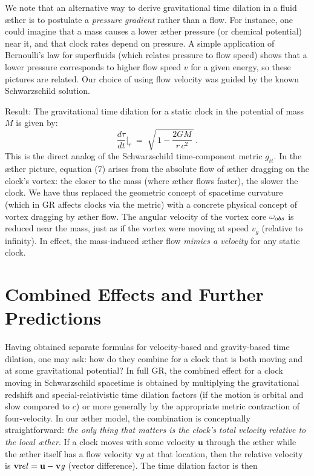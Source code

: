 \documentclass[aps,preprint,superscriptaddress]{revtex4}
\begin{document}
We note that an alternative way to derive gravitational time dilation in a fluid æther is to postulate a \textit{pressure gradient} rather than a flow. For instance, one could imagine that a mass causes a lower æther pressure (or chemical potential) near it, and that clock rates depend on pressure. A simple application of Bernoulli’s law for superfluids (which relates pressure to flow speed) shows that a lower pressure corresponds to higher flow speed $v$ for a given energy, so these pictures are related. Our choice of using flow velocity was guided by the known Schwarzschild solution.


Result: The gravitational time dilation for a static clock in the potential of mass $M$ is given by:
\begin{equation}
\boxed{\frac{d\tau}{dt}\Big|_{r} \;=\; \sqrt{\,1-\frac{2GM}{r\,c^2}\,}\,.} \tag{7}
\end{equation}
This is the direct analog of the Schwarzschild time-component metric $g_{tt}$. In the æther picture, equation (7) arises from the absolute flow of æther dragging on the clock’s vortex: the closer to the mass (where æther flows faster), the slower the clock. We have thus replaced the geometric concept of spacetime curvature (which in GR affects clocks via the metric) with a concrete physical concept of vortex dragging by æther flow. The angular velocity of the vortex core $\omega_{\textrm obs}$ is reduced near the mass, just as if the vortex were moving at speed $v_g$ (relative to infinity). In effect, the mass-induced æther flow \textit{mimics a velocity} for any static clock.


\section*{Combined Effects and Further Predictions}

Having obtained separate formulas for velocity-based and gravity-based time dilation, one may ask: how do they combine for a clock that is both moving and at some gravitational potential? In full GR, the combined effect for a clock moving in Schwarzschild spacetime is obtained by multiplying the gravitational redshift and special-relativistic time dilation factors (if the motion is orbital and slow compared to $c$) or more generally by the appropriate metric contraction of four-velocity. In our æther model, the combination is conceptually straightforward: \textit{the only thing that matters is the clock’s total velocity relative to the local æther}. If a clock moves with some velocity $\mathbf{u}$ through the æther while the æther itself has a flow velocity $\mathbf{v}\textit{g}$ at that location, then the relative velocity is $\mathbf{v}{\textrm rel} = \mathbf{u} - \mathbf{v}\textit{g}$ (vector difference). The time dilation factor is then
\end{document}
